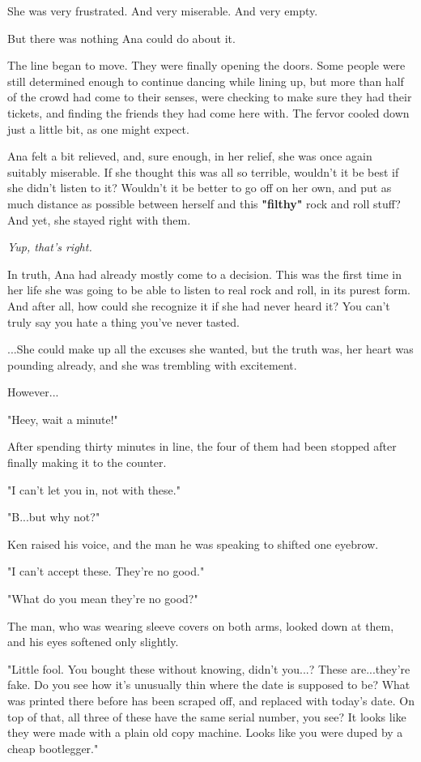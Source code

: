 \documentclass[
]{article}
\begin{document}
She was very frustrated. And very miserable. And very empty.

But there was nothing Ana could do about it.

The line began to move. They were finally opening the doors. Some people
were still determined enough to continue dancing while lining up, but
more than half of the crowd had come to their senses, were checking to
make sure they had their tickets, and finding the friends they had come
here with. The fervor cooled down just a little bit, as one might
expect.

Ana felt a bit relieved, and, sure enough, in her relief, she was once
again suitably miserable. If she thought this was all so terrible,
wouldn't it be best if she didn't listen to it? Wouldn't it be better to
go off on her own, and put as much distance as possible between herself
and this \textbf{"filthy"} rock and roll stuff? And yet, she stayed
right with them.

\emph{Yup, that's right.}

In truth, Ana had already mostly come to a decision. This was the first
time in her life she was going to be able to listen to real rock and
roll, in its purest form. And after all, how could she recognize it if
she had never heard it? You can't truly say you hate a thing you've
never tasted.

...She could make up all the excuses she wanted, but the truth was, her
heart was pounding already, and she was trembling with excitement.

However...

"Heey, wait a minute!"

After spending thirty minutes in line, the four of them had been stopped
after finally making it to the counter.

"I can't let you in, not with these."

"B...but why not?"

Ken raised his voice, and the man he was speaking to shifted one
eyebrow.

"I can't accept these. They're no good."

"What do you mean they're no good?"

The man, who was wearing sleeve covers on both arms, looked down at
them, and his eyes softened only slightly.

"Little fool. You bought these without knowing, didn't you...? These
are...they're fake. Do you see how it's unusually thin where the date is
supposed to be? What was printed there before has been scraped off, and
replaced with today's date. On top of that, all three of these have the
same serial number, you see? It looks like they were made with a plain
old copy machine. Looks like you were duped by a cheap bootlegger."
\end{document}
